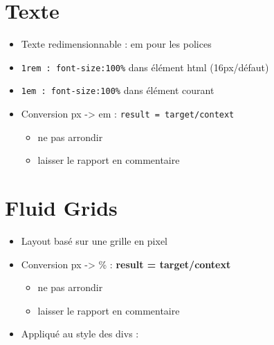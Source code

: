 \hypertarget{texte}{%
\section{Texte}\label{texte}}

\begin{itemize}
\tightlist
\item
  Texte redimensionnable : em pour les polices
\item
  \textenglish{\texttt{1rem\ :\ font-size:100\%}} dans élément html
  (16px/défaut)
\item
  \textenglish{\texttt{1em\ :\ font-size:100\%}} dans élément courant
\item
  Conversion px -\textgreater{} em :
  \textenglish{\texttt{result\ =\ target/context}}

  \begin{itemize}
  \tightlist
  \item
    ne pas arrondir
  \item
    laisser le rapport en commentaire
  \end{itemize}
\end{itemize}

\hypertarget{fluid-grids}{%
\section{Fluid Grids}\label{fluid-grids}}

\begin{itemize}
\tightlist
\item
  Layout basé sur une grille en pixel
\item
  Conversion px -\textgreater{} \% : \textbf{result = target/context}

  \begin{itemize}
  \tightlist
  \item
    ne pas arrondir
  \item
    laisser le rapport en commentaire
  \end{itemize}
\item
  Appliqué au style des divs :
\end{itemize}

\begin{english}

\begin{Shaded}
\begin{Highlighting}[]
\end{Highlighting}
\end{Shaded}

\end{english}

